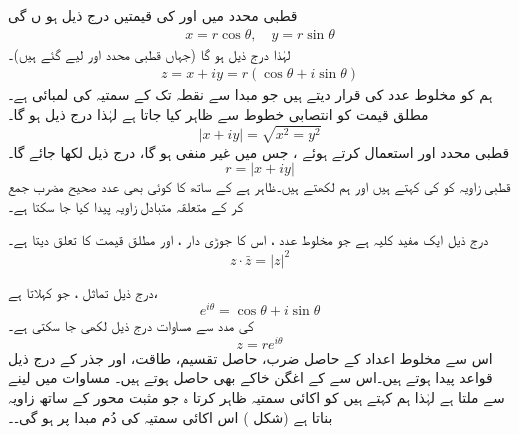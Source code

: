 قطبی محدد میں  اور   کی قیمتیں درج ذیل ہو ں گی
\begin{align*}
x=r\cos \theta,\quad y=r\sin\theta
\end{align*}
لہٰذا درج ذیل ہو گا  (جہاں قطبی محدد  اور  لیے گئے ہیں)۔
\begin{align}\label{مساوات_ضمیمہ_مخلوط_دس}
z=x+iy=r(\cos \theta+i\sin\theta)
\end{align}
ہم  کو مخلوط عدد  کی  قرار دیتے ہیں جو  مبدا سے نقطہ  تک کے  سمتیہ  کی لمبائی ہے۔ مطلق قیمت کو  انتصابی  خطوط  سے ظاہر کیا جاتا ہے لہٰذا درج ذیل ہو گا۔
\[|x+iy|=\sqrt{x^2=y^2}\]
قطبی محدد  اور   استعمال کرتے ہوئے ، جس میں  غیر منفی  ہو گا، درج ذیل لکھا جائے گا۔
\[r=|x+iy|\]
قطبی زاویہ  کو  کی   کہتے ہیں   اور ہم  لکھتے ہیں۔ظاہر ہے  کے ساتھ  کا    کوئی بھی عدد صحیح  مضرب جمع کر کے     متعلقہ   متبادل  زاویہ پیدا کیا جا سکتا ہے۔

درج ذیل  ایک مفید کلیہ ہے جو  مخلوط عدد ،  اس کا  جوڑی دار ، اور   مطلق قیمت  کا تعلق دیتا ہے۔
\[z\cdot \bar{z}=|z|^2\]

درج ذیل تماثل ، جو  کہلاتا ہے،
\[e^{i\theta}=\cos\theta+i\sin\theta\]
کی مدد سے مساوات  درج ذیل لکھی جا سکتی ہے۔
\[z=re^{i\theta}\]
اس سے  مخلوط اعداد کے حاصل ضرب، حاصل تقسیم، طاقت، اور جذر  کے  درج ذیل قواعد پیدا ہوتے ہیں۔اس سے  کے  اغگن خاکے بھی حاصل ہوتے ہیں۔ مساوات   میں  لینے سے   ملتا ہے لہٰذا  ہم کہتے ہیں    کو اکائی  سمتیہ ظاہر کرتا ہ جو مثبت محور  کے ساتھ زاویہ  بناتا ہے (شکل ) اس اکائی سمتیہ کی دُم مبدا پر ہو گی۔۔

